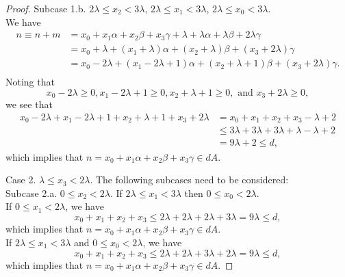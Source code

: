 \begin{proof}
Subcase 1.b. $2 \lambda \leq x_2 < 3 \lambda$, $2 \lambda \leq x_1 < 3\lambda$, $2 \lambda \leq x_0 < 3\lambda$. \\
We have
\begin{align*}
n \equiv n + m &= x_0 + x_1\alpha + x_2\beta + x_3\gamma + \lambda + \lambda \alpha + \lambda \beta + 2 \lambda \gamma\\
&=  x_0 + \lambda + (x_1 + \lambda) \alpha + (x_2 + \lambda) \beta + (x_3 + 2 \lambda) \gamma\\ 
&=  x_0 -  2\lambda + (x_1 - 2 \lambda + 1) \alpha + (x_2 + \lambda + 1) \beta + (x_3 + 2 \lambda)
 \gamma.\\ 
\end{align*}
Noting that
\[  x_0 -  2\lambda \geq 0, x_1 - 2 \lambda + 1 \geq 0, x_2 + \lambda + 1 \geq 0, \text{ and } x_3 + 2 \lambda \geq 0, \]
we see that 
\begin{align*}
x_0 -  2\lambda + x_1 - 2 \lambda + 1 + x_2 + \lambda + 1 + x_3 + 2 \lambda &= x_0  + x_1 +  x_2 + x_3 -  \lambda + 2 \\
&\leq 3 \lambda + 3 \lambda + 3 \lambda + \lambda - \lambda + 2\\
&= 9 \lambda + 2 \leq d,
\end{align*}
which implies that $n = x_0 + x_1\alpha + x_2\beta + x_3\gamma \in dA$. 

Case 2. $\lambda \leq x_3 < 2\lambda$. The following subcases need to be considered:\\
Subcase 2.a. $0 \leq x_2 < 2 \lambda.$ If $2 \lambda \leq x_1 < 3 \lambda$ then $0 \leq x_0 < 2\lambda$. \\
If $0 \leq x_1 < 2 \lambda$, we have 
\[ x_0 + x_1 + x_2 + x_3 \leq 2\lambda + 2\lambda + 2\lambda + 3\lambda = 9\lambda \leq d, \]
which implies that $n = x_0 + x_1\alpha + x_2\beta + x_3\gamma \in dA$. \\
If $2 \lambda \leq x_1 < 3 \lambda$ and  $0 \leq x_0 < 2\lambda$, we have 
\[ x_0 + x_1 + x_2 + x_3 \leq 2\lambda + 2\lambda + 3\lambda + 2 \lambda = 9\lambda \leq d, \]
which implies that $n = x_0 + x_1\alpha + x_2\beta + x_3\gamma \in dA$. 


\end{proof}
